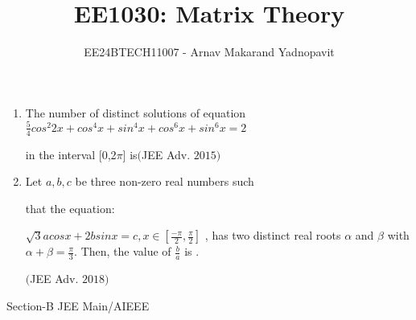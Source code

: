 \documentclass[journal,12pt,twocolumn]{IEEEtran}
\theoremstyle{remark}
\begin{document}

\vspace{3cm}

\title{EE1030: Matrix Theory}
\author{EE24BTECH11007 - Arnav Makarand Yadnopavit}
\maketitle
\newpage
\bigskip

\renewcommand{\thefigure}{\theenumi}
\renewcommand{\thetable}{\theenumi}

\begin{enumerate}[start=6,label={\arabic*}.]
\item The number of distinct solutions of equation
\medskip
$\frac{5}{4}cos^2 2x+cos^4 x+sin^4 x+cos^6 x+sin^6 x=2$
\smallskip

in the interval [0,2$\pi$] is\hfill{$($JEE Adv. $2015)$} 
\medskip
    \item Let $a, b, c$ be three non-zero real numbers such\smallskip
    
    that the equation:
    \smallskip

$\sqrt{3} acosx+2bsinx = c,x\in \left[\frac{-\pi}{2},\frac{\pi}{2}\right]$
, has two distinct real roots $\alpha$ and $\beta$ with $\alpha+\beta=\frac{\pi}{3}$. Then, the value of $\frac{b}{a}$ is \underline{\hspace{2cm}}.\hspace{0.5cm}

\hfill{$($JEE Adv. $2018)$}
\end{enumerate}
\bigskip

{\LARGE Section-B JEE Main/AIEEE}
\bigskip
\end{document}
